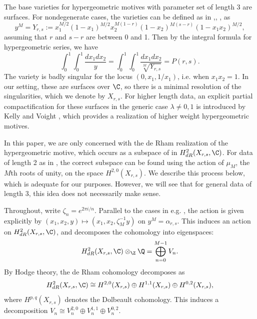 \documentclass[12pt]{amsart}
\theoremstyle{definition}
\theoremstyle{remark}
\begin{document}
 The base varieties for hypergeometric motives with parameter set of length 3 are surfaces. For nondegenerate cases, the varieties can be defined as in \cite{deinesetal2},\cite{flrst}, \cite{kellyvoight}, \cite{robertsvillegas} as $$y^M=Y_{r,s}:=x_1^{M/2}(1-x_1)^{M/2}x_2^{M(1-r)}(1-x_2)^{M(s-r)}(1-x_1x_2)^{M/2},$$ assuming that $r$ and $s-r$ are between 0 and 1. Then by the integral formula for hypergeometric series, we have $$\int_0^1\int_0^1\frac{dx_1dx_2}{y}=\int_0^1\int_0^1\frac{dx_1dx_2}{\sqrt[M]{Y_{r,s}}}=P(r,s).$$ The variety is badly singular for the locus $(0,x_1,1/x_1)$, i.e. when $x_1x_2=1$. In our setting, these are surfaces over $\C$, so there is a minimal resolution of the singularities, which we denote by $X_{r,s}$. For higher length data, an explicit partial compactification for these surfaces in the generic case $\lambda \neq 0,1$ is introduced by Kelly and Voight \cite{kellyvoight}, which provides a realization of higher weight hypergeometric motives. 

 In this paper, we are only concerned with the de Rham realization of the hypergeometric motive, which occurs as a subspace of in $H^2_{dR}(X_{r,s},\C)$. For data of length 2 as in \cite{archinard}, the correct subspace can be found using the action of $\mu_M$, the $M$th roots of unity, on the space $H^{2,0}(X_{r,s})$. We describe this process below, which is adequate for our purposes. However, we will see that for general data of length 3, this idea does not necessarily make sense.
 
 Throughout, write $\zeta_n=e^{2\pi i/n}$. Parallel to the cases in e.g. \cite{archinard}, the action is given explicitly by $(x_1,x_2,y)\mapsto (x_1,x_2,\zeta_M^{-1}y)$ on $y^M=\alpha_{r,s}$. This induces an action on $H^{2}_{dR}(X_{r,s},\C)$, and decomposes the cohomology into eigenspaces: $$H^{2}_{dR}(X_{r,s},\C)\otimes_{\Z}\Q=\bigoplus_{n=0}^{M-1}V_n.$$   By Hodge theory, the de Rham cohomology decomposes as $$H^2_{dR}(X_{r,s},\C)\cong H^{2,0}(X_{r,s})\oplus H^{1,1}(X_{r,s})\oplus H^{0,2}(X_{r,s}),$$ where $H^{p,q}(X_{r,s})$ denotes the Dolbeault cohomology. This induces a decomposition $V_n\cong V_{n}^{2,0}\oplus V_n^{1,1}\oplus V_{n}^{0,2}$.
 
\end{document}
